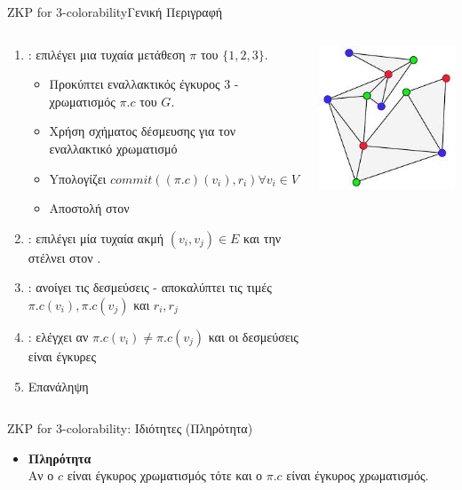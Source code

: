 \documentclass[handout]{beamer}
\begin{document}
\begin{frame}{ZKP for 3-colorability}{Γενική Περιγραφή}
\begin{columns}
\begin{small}
\begin{enumerate}
 	\setlength \itemsep{0.1em}
	\item \prv: επιλέγει μια τυχαία μετάθεση $\pi$ του $\{ 1,2,3 \}$. \pause
	\begin{itemize}
		\item Προκύπτει εναλλακτικός έγκυρος 3 - χρωματισμός $\pi.c$ του $G$. \pause
		\item Χρήση σχήματος δέσμευσης για τον εναλλακτικό χρωματισμό
		\item Yπολογίζει $commit( (\pi.c)(v_i), r_i) \forall v_i \in V$ 
		\item Αποστολή στον \ver \pause
	\end{itemize}
	\item \ver: επιλέγει μία τυχαία ακμή $(v_i, v_j) \in E$ και την στέλνει στον \prv. \pause
	\item \prv: ανοίγει τις δεσμεύσεις - αποκαλύπτει τις τιμές $\pi.c(v_i),\pi.c(v_j)$ και $r_i, r_j$ \pause
	\item \ver: ελέγχει αν $\pi.c(v_i) \neq \pi.c(v_j)$ και οι δεσμεύσεις είναι έγκυρες
	\item Επανάληψη
\end{enumerate}
\end{small}
\begin{center}
\includegraphics[scale=0.6]{3cp2.jpg}
\end{center}
\end{columns}
\end{frame}

 
\begin{frame}{ZKP for 3-colorability: Ιδιότητες (Πληρότητα)} 
\begin{itemize}
\item \textbf{Πληρότητα}\\
Αν ο $c$ είναι έγκυρος χρωματισμός τότε και ο $\pi.c$ είναι έγκυρος χρωματισμός.
\end{itemize}
\end{frame}
\end{document}
